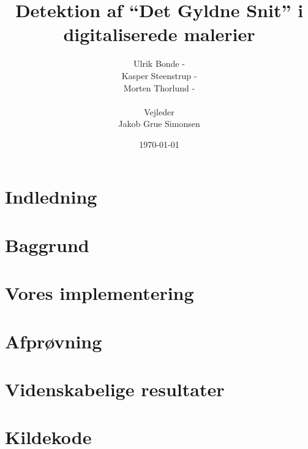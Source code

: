 \documentclass[a4paper, 10pt, danish, final]{article}
\title{Detektion af ``Det Gyldne Snit'' i digitaliserede malerier}
\author{Ulrik Bonde - \mailto{bonde@diku.dk}\\
Kasper Steenstrup - \mailto{khsj@diku.dk}\\
Morten Thorlund - \mailto{thorlund@diku.dk}\\
\\
Vejleder\\Jakob Grue Simonsen}
\date{\today}
\begin{document}
\maketitle
\thispagestyle{empty}



\tableofcontents
\listoftables
\listoffigures

\section{Indledning}


\section{Baggrund}


\section{Vores implementering}


\section{Afprøvning}

\section{Videnskabelige resultater}

\newpage




\newpage
\appendix

\section{Kildekode}
%
\end{document}

